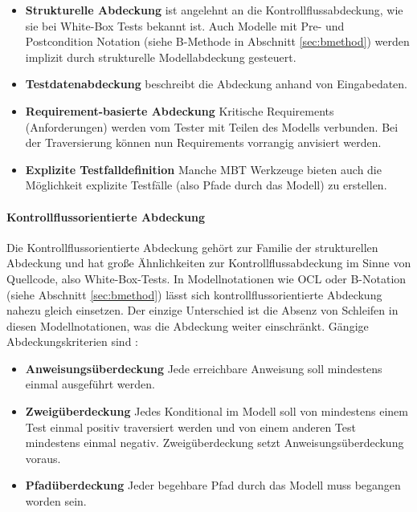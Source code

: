 \begin{itemize}
\item \textbf{Strukturelle Abdeckung} ist angelehnt an die Kontrollflussabdeckung, wie sie bei White-Box Tests bekannt ist. Auch Modelle mit Pre- und Postcondition Notation (siehe B-Methode in Abschnitt \ref{sec:bmethod}) werden implizit durch strukturelle Modellabdeckung gesteuert.
\item \textbf{Testdatenabdeckung} beschreibt die Abdeckung anhand von Eingabedaten.
\item \textbf{Requirement-basierte Abdeckung} Kritische Requirements (Anforderungen) werden vom Tester mit Teilen des Modells verbunden. Bei der Traversierung können nun Requirements vorrangig anvisiert werden.
\item \textbf{Explizite Testfalldefinition} Manche \Gls{MBT} Werkzeuge bieten auch die Möglichkeit explizite Testfälle (also Pfade durch das Modell) zu erstellen.
\end{itemize}

\paragraph{Kontrollflussorientierte Abdeckung}\label{coverage_control} Die Kontrollflussorientierte Abdeckung gehört zur Familie der strukturellen Abdeckung und hat große Ähnlichkeiten zur Kontrollflussabdeckung im Sinne von Quellcode, also White-Box-Tests. In Modellnotationen wie OCL \cite{warmer_object_2004} oder B-Notation (siehe Abschnitt \ref{sec:bmethod}) lässt sich kontrollflussorientierte Abdeckung nahezu gleich einsetzen. Der einzige Unterschied ist die Absenz von Schleifen in diesen Modellnotationen, was die Abdeckung weiter einschränkt. Gängige Abdeckungskriterien sind \cite{rossner_basiswissen_2010}:
\begin{itemize}
\item \textbf{Anweisungsüberdeckung} Jede erreichbare Anweisung soll mindestens einmal ausgeführt werden.
\item \textbf{Zweigüberdeckung} Jedes Konditional im Modell soll von mindestens einem Test einmal positiv traversiert werden und von einem anderen Test mindestens einmal negativ. Zweigüberdeckung setzt Anweisungsüberdeckung voraus.
\item \textbf{Pfadüberdeckung} Jeder begehbare Pfad durch das Modell muss begangen worden sein.
\end{itemize}

